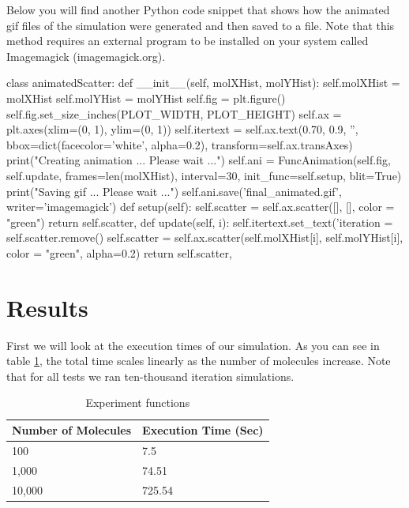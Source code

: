 \documentclass[12pt,a4paper]{article}
\begin{document}
	Below you will find another Python code snippet that shows how the animated gif files of the simulation were generated and then saved to a file. Note that this method requires an external program to be installed on your system called Imagemagick (imagemagick.org).
	
	\begin{python}
	class animatedScatter:
		def __init__(self, molXHist, molYHist):
			self.molXHist = molXHist
			self.molYHist = molYHist
			self.fig = plt.figure()
			self.fig.set_size_inches(PLOT_WIDTH, PLOT_HEIGHT)
			self.ax = plt.axes(xlim=(0, 1), ylim=(0, 1))
			self.itertext = self.ax.text(0.70, 0.9,  '', bbox=dict(facecolor='white', alpha=0.2), transform=self.ax.transAxes)
			print("Creating animation ... Please wait ...")
			self.ani = FuncAnimation(self.fig, self.update, frames=len(molXHist), interval=30, 
			init_func=self.setup, blit=True)
			print("Saving gif ... Please wait ...")
			self.ani.save('final_animated.gif', writer='imagemagick')
			def setup(self):
			self.scatter = self.ax.scatter([], [], color = "green")
			return self.scatter,
		def update(self, i):
			self.itertext.set_text('iteration = %
			self.scatter.remove()
			self.scatter = self.ax.scatter(self.molXHist[i], self.molYHist[i], color = "green", alpha=0.2)
			return self.scatter,
	\end{python}
	
	\section{Results}\label{results}
	
	First we will look at the execution times of our simulation. As you can see in table \ref{tab:functions}, the total time scales linearly as the number of molecules increase. Note that for all tests we ran ten-thousand iteration simulations.\\
	
	\begin{table}[!htb]
		\caption{Experiment functions} 
		\small
		\centering
		\begin{tabular}{ m{5cm} | m{5cm}}
			\toprule
			Number of Molecules & Execution Time (Sec) \\
			\midrule
			100    & 7.5 \\
			1,000  & 74.51 \\
			10,000 & 725.54 \\
			\toprule
		\end{tabular}
		\label{tab:functions}
	\end{table}
	
\end{document}
